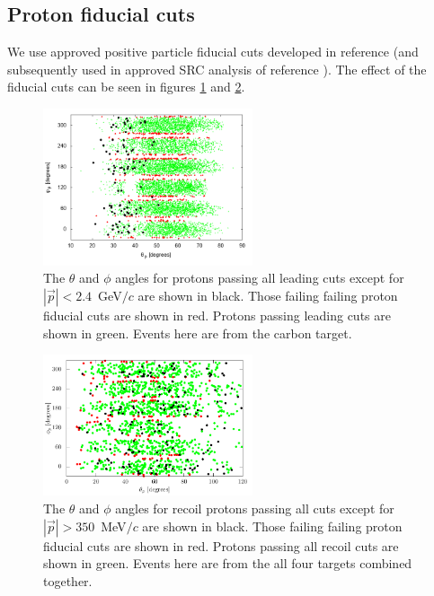 \documentclass{article}
\begin{document}
\subsection{Proton fiducial cuts}

We use approved positive particle fiducial cuts developed in reference
\cite{Lamiah:note} (and subsequently used in approved SRC analysis of reference \cite{Erez:note}). 
The effect of the fiducial cuts can be seen in figures \ref{fig:lead_fid} and \ref{fig:recoil_fid}.

\begin{figure}[h]
\centering
\includegraphics[width=0.55\textwidth]{lead_fid.png}
\caption[Leading proton fiducial cuts]{
The $\theta$ and $\phi$ angles for protons passing all leading cuts except for $|\vec{p}|<2.4$~GeV$/c$ are shown in black. Those 
failing failing proton fiducial cuts are shown in red. Protons passing leading cuts are shown in green. Events here are 
from the carbon target. 
\label{fig:lead_fid}}
\end{figure}

\begin{figure}[h]
\centering
\includegraphics[width=0.55\textwidth]{recoil_fid.pdf}
\caption[Fiducial cuts for recoil protons]{
The $\theta$ and $\phi$ angles for recoil protons passing all cuts except for $|\vec{p}|>350$~MeV$/c$ are shown in black. Those 
failing failing proton fiducial cuts are shown in red. Protons passing all recoil cuts are shown in green. Events here are 
from the all four targets combined together. 
\label{fig:recoil_fid}
}
\end{figure}
\end{document}
